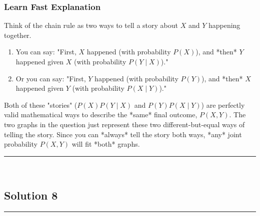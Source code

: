 \documentclass{article}
\begin{document}
\subsubsection*{Learn Fast Explanation}
Think of the chain rule as two ways to tell a story about $X$ and $Y$ happening together.
\begin{enumerate}
    \item You can say: "First, $X$ happened (with probability $P(X)$), and *then* $Y$ happened given $X$ (with probability $P(Y \mid X)$)."
    \item Or you can say: "First, $Y$ happened (with probability $P(Y)$), and *then* $X$ happened given $Y$ (with probability $P(X \mid Y)$)."
\end{enumerate}
Both of these "stories" ($P(X)P(Y \mid X)$ and $P(Y)P(X \mid Y)$) are perfectly valid mathematical ways to describe the *same* final outcome, $P(X, Y)$. The two graphs in the question just represent these two different-but-equal ways of telling the story. Since you can *always* tell the story both ways, *any* joint probability $P(X, Y)$ will fit *both* graphs.

\noindent\rule{\textwidth}{0.4pt}\\
\newpage

\subsection*{Solution 8}
\noindent\rule{\textwidth}{0.4pt}\\
\end{document}

